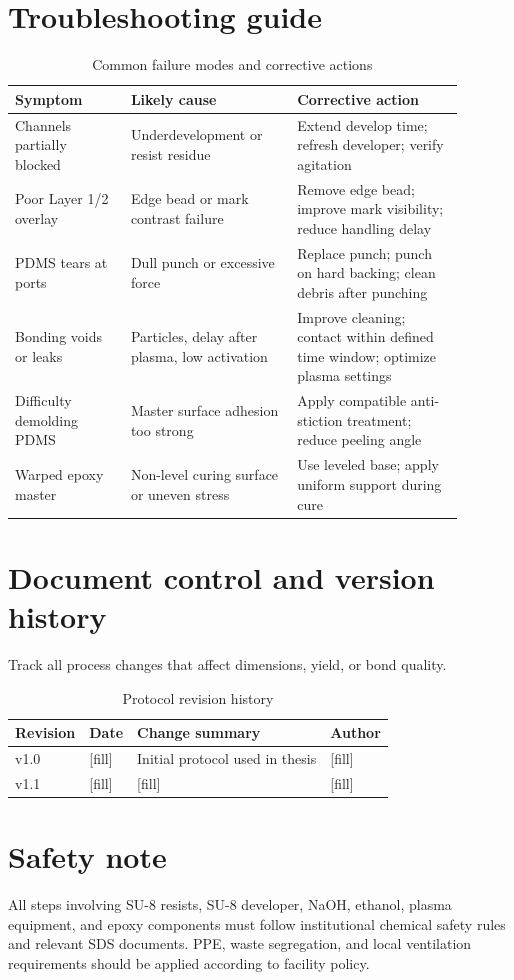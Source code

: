 \section{Troubleshooting guide}
\begin{table}[H]
\centering
\caption{Common failure modes and corrective actions}
\label{tab:fab_troubleshooting}
\begin{tabular}{p{0.23\linewidth} p{0.33\linewidth} p{0.33\linewidth}}
\hline
\textbf{Symptom} & \textbf{Likely cause} & \textbf{Corrective action} \\
\hline
Channels partially blocked & Underdevelopment or resist residue & Extend develop time; refresh developer; verify agitation \\
Poor Layer 1/2 overlay & Edge bead or mark contrast failure & Remove edge bead; improve mark visibility; reduce handling delay \\
PDMS tears at ports & Dull punch or excessive force & Replace punch; punch on hard backing; clean debris after punching \\
Bonding voids or leaks & Particles, delay after plasma, low activation & Improve cleaning; contact within defined time window; optimize plasma settings \\
Difficulty demolding PDMS & Master surface adhesion too strong & Apply compatible anti-stiction treatment; reduce peeling angle \\
Warped epoxy master & Non-level curing surface or uneven stress & Use leveled base; apply uniform support during cure \\
\hline
\end{tabular}
\end{table}

\section{Document control and version history}
Track all process changes that affect dimensions, yield, or bond quality.

\begin{table}[H]
\centering
\caption{Protocol revision history}
\label{tab:fab_revision_history}
\begin{tabular}{llll}
\hline
\textbf{Revision} & \textbf{Date} & \textbf{Change summary} & \textbf{Author} \\
\hline
v1.0 & [fill] & Initial protocol used in thesis & [fill] \\
v1.1 & [fill] & [fill] & [fill] \\
\hline
\end{tabular}
\end{table}

\section{Safety note}
All steps involving SU-8 resists, SU-8 developer, NaOH, ethanol, plasma equipment, and epoxy components must follow institutional chemical safety rules and relevant SDS documents. PPE, waste segregation, and local ventilation requirements should be applied according to facility policy.
